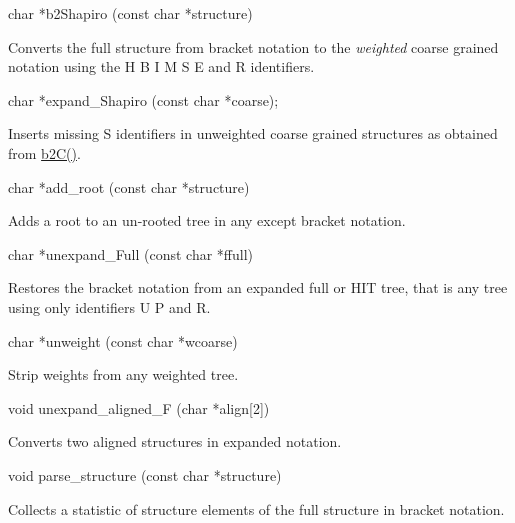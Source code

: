 \begin{DoxyVerb}char *b2Shapiro (const char *structure)
\end{DoxyVerb}
 Converts the full structure from bracket notation to the {\itshape weighted} coarse grained notation using the \textquotesingle{}H\textquotesingle{} \textquotesingle{}B\textquotesingle{} \textquotesingle{}I\textquotesingle{} \textquotesingle{}M\textquotesingle{} \textquotesingle{}S\textquotesingle{} \textquotesingle{}E\textquotesingle{} and \textquotesingle{}R\textquotesingle{} identifiers.

\begin{DoxyVerb}char  *expand_Shapiro (const char *coarse);
\end{DoxyVerb}
 Inserts missing \textquotesingle{}S\textquotesingle{} identifiers in unweighted coarse grained structures as obtained from \mbox{\hyperlink{group__struct__utils_ga9c80d92391f2833549a8b6dac92233f0}{b2\+C()}}.

\begin{DoxyVerb}char *add_root (const char *structure)
\end{DoxyVerb}
 Adds a root to an un-\/rooted tree in any except bracket notation.

\begin{DoxyVerb}char  *unexpand_Full (const char *ffull)
\end{DoxyVerb}
 Restores the bracket notation from an expanded full or H\+IT tree, that is any tree using only identifiers \textquotesingle{}U\textquotesingle{} \textquotesingle{}P\textquotesingle{} and \textquotesingle{}R\textquotesingle{}.

\begin{DoxyVerb}char  *unweight (const char *wcoarse)
\end{DoxyVerb}
 Strip weights from any weighted tree.

\begin{DoxyVerb}void   unexpand_aligned_F (char *align[2])
\end{DoxyVerb}
 Converts two aligned structures in expanded notation.

\begin{DoxyVerb}void   parse_structure (const char *structure)
\end{DoxyVerb}
 Collects a statistic of structure elements of the full structure in bracket notation.

